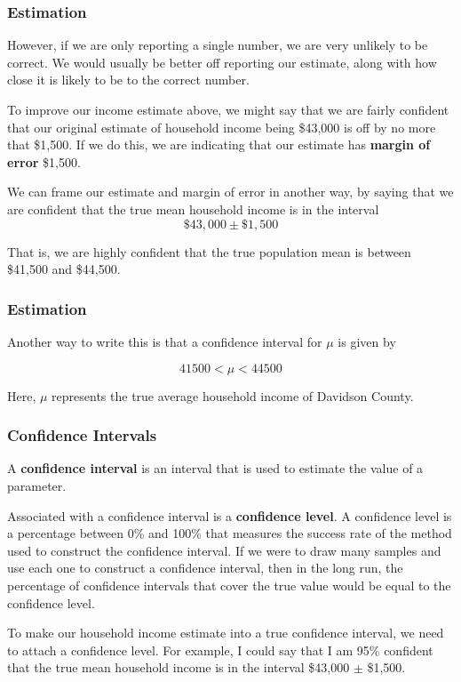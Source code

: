 \documentclass[11pt, table]{beamer}
\newcommand{\p}{\pause}
\begin{document}
\begin{frame}
\frametitle{Estimation}
However, if we are only reporting a single number, we are very unlikely to be correct. We would usually be better off reporting our estimate, along with how close it is likely to be to the correct number.\p

To improve our income estimate above, we might say that we are fairly confident that our original estimate of household income being \$43,000 is off by no more that \$1,500. If we do this, we are indicating that our estimate has \textbf{margin of error} \$1,500.\p

We can frame our estimate and margin of error in another way, by saying that we are confident that the true mean household income is in the interval
$$\$43,000 \pm \$1,500$$\p

That is, we are highly confident that the true population mean is between \$41,500 and \$44,500.

\end{frame}

\begin{frame}
\frametitle{Estimation}

Another way to write this is that a confidence interval for $\mu$ is given by

$$41500 < \mu < 44500$$

Here, $\mu$ represents the true average household income of Davidson County.
\end{frame}

\begin{frame}
\frametitle{Confidence Intervals}
A \textbf{confidence interval} is an interval that is used to estimate the value of a parameter.\p

\vspace{0.25in}
Associated with a confidence interval is a \textbf{confidence level}.
A confidence level is a percentage between 0\% and 100\% that measures the success rate of the method used to construct the confidence interval. If we were to draw many samples and use each one to construct a confidence interval, then in the long run, the percentage of confidence intervals that cover the true value would be equal to the confidence level.\p

\vspace{0.25in}
To make our household income estimate into a true confidence interval, we need to attach a confidence level. For example, I could say that I am 95\% confident that the true mean household income is in the interval \$43,000 $\pm$ \$1,500.
\end{frame}
\end{document}
